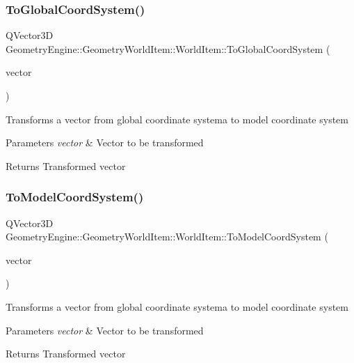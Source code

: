 \subsubsection{\texorpdfstring{ToGlobalCoordSystem()}{ToGlobalCoordSystem()}}
{\footnotesize\ttfamily Q\+Vector3D Geometry\+Engine\+::\+Geometry\+World\+Item\+::\+World\+Item\+::\+To\+Global\+Coord\+System (\begin{DoxyParamCaption}\item[{const Q\+Vector3D \&}]{vector }\end{DoxyParamCaption})\hspace{0.3cm}{\ttfamily [virtual]}}

Transforms a vector from global coordinate systema to model coordinate system 
\begin{DoxyParams}{Parameters}
{\em vector} & Vector to be transformed \\
\hline
\end{DoxyParams}
\begin{DoxyReturn}{Returns}
Transformed vector 
\end{DoxyReturn}
\mbox{\label{class_geometry_engine_1_1_geometry_world_item_1_1_world_item_a8391874ad6063fe8b09d7e6978dd0f20}} 
\subsubsection{\texorpdfstring{ToModelCoordSystem()}{ToModelCoordSystem()}}
{\footnotesize\ttfamily Q\+Vector3D Geometry\+Engine\+::\+Geometry\+World\+Item\+::\+World\+Item\+::\+To\+Model\+Coord\+System (\begin{DoxyParamCaption}\item[{const Q\+Vector3D \&}]{vector }\end{DoxyParamCaption})\hspace{0.3cm}{\ttfamily [virtual]}}

Transforms a vector from global coordinate systema to model coordinate system 
\begin{DoxyParams}{Parameters}
{\em vector} & Vector to be transformed \\
\hline
\end{DoxyParams}
\begin{DoxyReturn}{Returns}
Transformed vector 
\end{DoxyReturn}
\mbox{\label{class_geometry_engine_1_1_geometry_world_item_1_1_world_item_aa6e82e5d95ae34d0addb991cd84aca6f}} 
